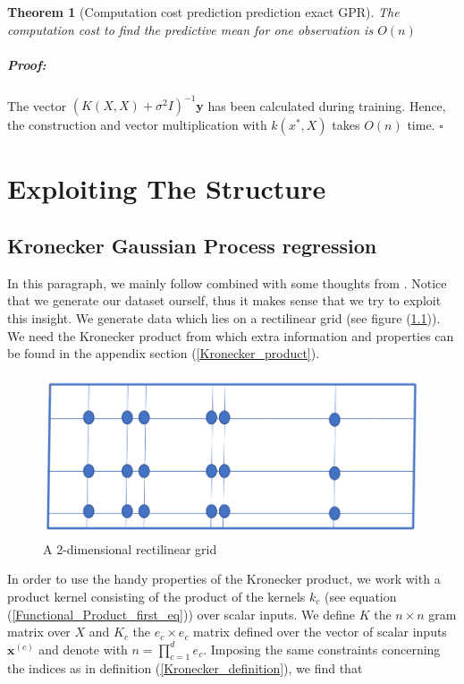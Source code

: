 \documentclass[12pt,a4paper,oneside]{book}
\newtheorem{Theorem}{Theorem}
\newenvironment{proof}{\paragraph{Proof:}}{\hfill$\square$}
\begin{document}
\begin{Theorem}[Computation cost prediction prediction exact GPR]
The computation cost to find the predictive mean for one observation is $O(n)$
\end{Theorem}
\begin{proof}
The vector $(K(X,X) + \sigma^2 I)^{-1} \bm{y}$ has been calculated during training. Hence, the construction and vector multiplication with $k(x^{\ast},X)$ takes $O(n)$ time.
\end{proof}

\chapter{Exploiting The Structure}

\section{Kronecker Gaussian Process regression}

In this paragraph, we mainly follow \cite{saatcci2012scalable} combined with some thoughts from \cite{wilson2015kernel}. Notice that we generate our dataset ourself, thus it makes sense that we try to exploit this insight. We generate data which lies on a rectilinear grid (see figure (\ref{fig:kronecker})). We need the Kronecker product from which extra information and properties can be found in the appendix section (\ref{Kronecker_product}).

\begin{figure}[!htb]
     \centering
     \includegraphics[width=0.4\linewidth]{kronecker}
     \caption{A 2-dimensional rectilinear grid}\label{fig:kronecker}
\end{figure}


In order to use the handy properties of the Kronecker product, we work with a product kernel consisting of the product of the kernels $k_c$  (see equation (\ref{Functional_Product_first_eq})) over scalar inputs. We define $K$ the $n \times n$ gram matrix over $X$ and $K_c$ the $e_c \times e_c$ matrix defined over the vector of scalar inputs $\bm{x}^{(c)}$ and denote with $n = \prod_{c=1}^d e_c$. Imposing the same constraints concerning the indices as in definition (\ref{Kronecker_definition}), we find that  
\end{document}
